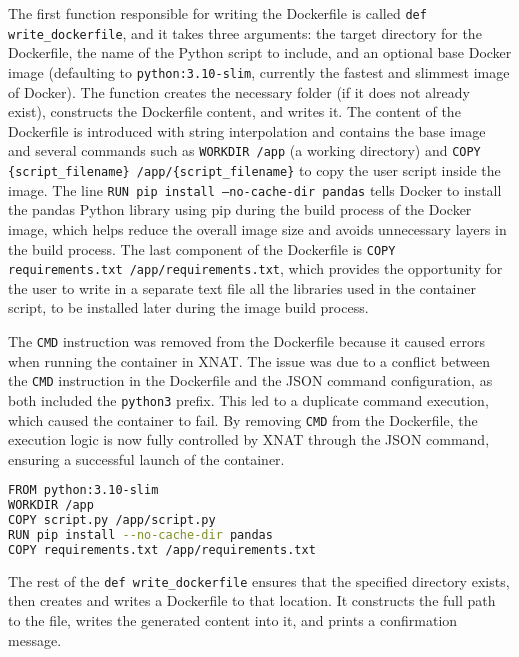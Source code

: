 The first function responsible for writing the Dockerfile is called \texttt{def write\_dockerfile}, and it takes three arguments: the target directory for the Dockerfile, the name of the Python script to include, and an optional base Docker image (defaulting to \texttt{python:3.10-slim}, currently the fastest and slimmest image of Docker). The function creates the necessary folder (if it does not already exist), constructs the Dockerfile content, and writes it. The content of the Dockerfile is introduced with string interpolation and contains the base image and several commands such as \texttt{WORKDIR /app} (a working directory) and \texttt{COPY \{script\_filename\} /app/\{script\_filename\}} to copy the user script inside the image. The line \texttt{RUN pip install --no-cache-dir pandas} tells Docker to install the pandas Python library using pip during the build process of the Docker image, which helps reduce the overall image size and avoids unnecessary layers in the build process. The last component of the Dockerfile is \texttt{COPY requirements.txt /app/requirements.txt}, which provides the opportunity for the user to write in a separate text file all the libraries used in the container script, to be installed later during the image build process.


The \texttt{CMD} instruction was removed from the Dockerfile because it caused errors when running the container in XNAT. The issue was due to a conflict between the \texttt{CMD} instruction in the Dockerfile and the JSON command configuration, as both included the \texttt{python3} prefix. This led to a duplicate command execution, which caused the container to fail. By removing \texttt{CMD} from the Dockerfile, the execution logic is now fully controlled by XNAT through the JSON command, ensuring a successful launch of the container.

\begin{lstlisting}[language=bash,caption={Dockerfile}]
FROM python:3.10-slim
WORKDIR /app
COPY script.py /app/script.py
RUN pip install --no-cache-dir pandas
COPY requirements.txt /app/requirements.txt
\end{lstlisting}

The rest of the \texttt{def write\_dockerfile} ensures that the specified directory exists, then creates and writes a Dockerfile to that location. It constructs the full path to the file, writes the generated content into it, and prints a confirmation message.



